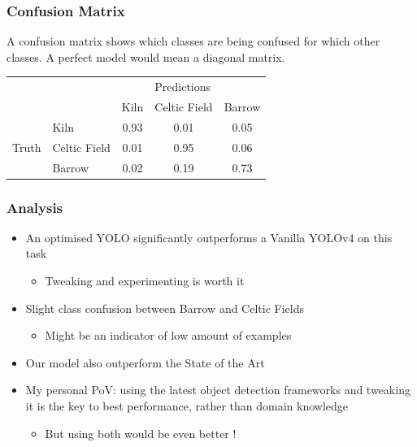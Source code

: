 \documentclass[aspectratio=169]{beamer}
\begin{document}
\begin{frame}
	\frametitle{Confusion Matrix}
	A confusion matrix shows which classes are being confused for which other classes. A perfect model would mean a diagonal matrix.
	\begin{table}[H]
	\centering
	\begin{tabular}{ll|ccc}
		&              & \multicolumn{1}{l}{} & \multicolumn{1}{l}{Predictions} & \multicolumn{1}{l}{} \\ \cline{3-5} 
								      &              & Kiln                 & Celtic Field                    & Barrow               \\ \hline
								      \multicolumn{1}{l|}{}      & Kiln         & 0.93           & 0.01                      & 0.05           \\
								      \multicolumn{1}{l|}{Truth} & Celtic Field & 0.01 & 0.95    & 0.06 \\
								      \multicolumn{1}{l|}{}      & Barrow       & 0.02 & 0.19 & 0.73
	\end{tabular}
	\label{tab:confMatYOLO}
\end{table}


\end{frame}
\begin{frame}
	\frametitle{Analysis}
	\begin{itemize}
		\item An optimised YOLO significantly outperforms a Vanilla YOLOv4 on this task 
			\begin{itemize}
				\item Tweaking and experimenting is worth it
			\end{itemize}
		\item Slight class confusion between Barrow and Celtic Fields
			\begin{itemize}
				\item Might be an indicator of low amount of examples 
			\end{itemize}
		\item Our model also outperform the State of the Art 
		\item My personal PoV: using the latest object detection frameworks and tweaking it is the key to best performance, rather than domain knowledge
			\begin{itemize}
				\item But using both would be even better !
			\end{itemize}
	\end{itemize}
\end{frame}
\end{document}
